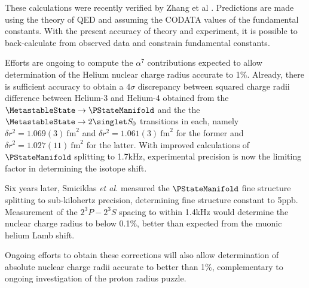 	These calculations were recently verified by Zhang et al \cite{Zhang15}.
	Predictions are made using the theory of QED and assuming the CODATA values of the fundamental constants.
	With the present accuracy of theory and experiment, it is possible to back-calculate from observed data and constrain fundamental constants.

	Efforts are ongoing to compute the $\alpha^7$ contributions expected to allow determination of the Helium nuclear charge radius accurate to 1\%\cite{Pachucki17}.
	Already, there is sufficient accuracy to obtain a $4\sigma$ discrepancy between squared charge radii difference between Helium-3 and Helium-4 obtained from the $\MetastableState \rightarrow \PStateManifold$ and the the $\MetastableState\rightarrow {2\singlet S_{0}}$ transitions in each, namely $\delta r^2 = 1.069(3)~\textrm{fm}^2$ and $\delta r^2 = 1.061(3)~\textrm{fm}^2$ for the former and $\delta r^2 = 1.027(11)~\textrm{fm}^2$ for the latter\cite{Pachucki15}.
	With improved calculations of $\PStateManifold$ splitting to 1.7kHz\cite{Pachucki17}, experimental precision is now the limiting factor in determining the isotope shift.
	

	Six years later, Smiciklas \textit{et al.} measured the $\PStateManifold$ fine structure splitting to sub-kilohertz precision, determining fine structure constant to 5ppb\cite{Smiciklas10}.
	Measurement of the $2^3P-2^3S$ spacing to within 1.4kHz would determine the nuclear charge radius to below 0.1\%, better than expected from the muonic helium Lamb shift\cite{Wienczek19}.
	 

	Ongoing efforts \cite{Pachucki17} to obtain these corrections will also allow determination of absolute nuclear charge radii accurate to better than 1\%, complementary to ongoing investigation of the proton radius puzzle.

